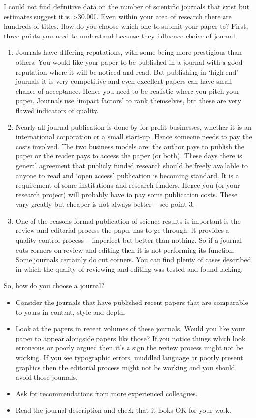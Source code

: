 \documentclass[
  titlepage]{book}
\begin{document}
I could not find definitive data on the number of scientific journals that exist but estimates suggest it is \textgreater30,000. Even within your area of research there are hundreds of titles. How do you choose which one to submit your paper to? First, three points you need to understand because they influence choice of journal.

\begin{enumerate}
\def\labelenumi{\arabic{enumi}.}
\item
  Journals have differing reputations, with some being more prestigious than others. You would like your paper to be published in a journal with a good reputation where it will be noticed and read. But publishing in `high end' journals it is very competitive and even excellent papers can have small chance of acceptance. Hence you need to be realistic where you pitch your paper. Journals use `impact factors' to rank themselves, but these are very flawed indicators of quality.
\item
  Nearly all journal publication is done by for-profit businesses, whether it is an international corporation or a small start-up. Hence someone needs to pay the costs involved. The two business models are: the author pays to publish the paper or the reader pays to access the paper (or both). These days there is general agreement that publicly funded research should be freely available to anyone to read and `open access' publication is becoming standard. It is a requirement of some institutions and research funders. Hence you (or your research project) will probably have to pay some publication costs. These vary greatly but cheaper is not always better -- see point 3.
\item
  One of the reasons formal publication of science results is important is the review and editorial process the paper has to go through. It provides a quality control process -- imperfect but better than nothing. So if a journal cuts corners on review and editing then it is not performing its function. Some journals certainly do cut corners. You can find plenty of cases described in which the quality of reviewing and editing was tested and found lacking.
\end{enumerate}

So, how do you choose a journal?

\begin{itemize}
\item
  Consider the journals that have published recent papers that are comparable to yours in content, style and depth.
\item
  Look at the papers in recent volumes of these journals. Would you like your paper to appear alongside papers like those? If you notice things which look erroneous or poorly argued then it's a sign the review process might not be working. If you see typographic errors, muddled language or poorly present graphics then the editorial process might not be working and you should avoid those journals.
\item
  Ask for recommendations from more experienced colleagues.
\item
  Read the journal description and check that it looks OK for your work.
\end{itemize}
\end{document}
